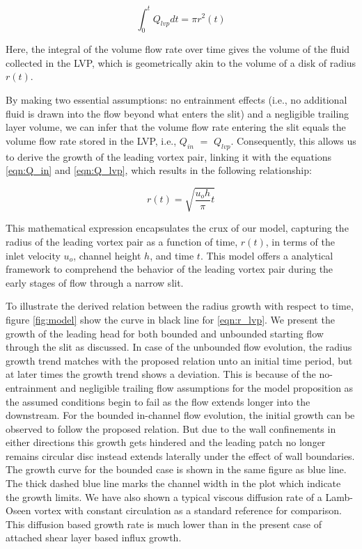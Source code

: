 \documentclass[final,3p,10pt,times,review,authoryear]{elsarticle}
\begin{document}
	\begin{equation}
		\int_{0}^{t}Q_{lvp}dt= \pi r^2(t)
		\label{eqn:Q_lvp}
	\end{equation}
	
	Here, the integral of the volume flow rate over time gives the volume of the fluid collected in the LVP, which is geometrically akin to the volume of a disk of radius $r(t)$.
	
	By making two essential assumptions: no entrainment effects (i.e., no additional fluid is drawn into the flow beyond what enters the slit) and a negligible trailing layer volume, we can infer that the volume flow rate entering the slit equals the volume flow rate stored in the LVP, i.e., $Q_{in}$ $=$ $Q_{lvp}$. Consequently, this allows us to derive the growth of the leading vortex pair, linking it with the equations \ref{eqn:Q_in} and \ref{eqn:Q_lvp}, which results in the following relationship:
	
	\begin{equation}
		r(t) = \sqrt{\frac{u_o h}{\pi}t}
		\label{eqn:r_lvp}
	\end{equation}
	
	This mathematical expression encapsulates the crux of our model, capturing the radius of the leading vortex pair as a function of time, $r(t)$, in terms of the inlet velocity $u_o$, channel height $h$, and time $t$. This model offers a analytical framework to comprehend the behavior of the leading vortex pair during the early stages of flow through a narrow slit. 
	
	To illustrate the derived relation between the radius growth with respect to time, figure \ref{fig:model} show the curve in black line for \ref{eqn:r_lvp}. We present the growth of the leading head for both bounded and unbounded starting flow through the slit as discussed. In case of the unbounded flow evolution, the radius growth trend matches with the proposed relation unto an initial time period, but at later times the growth trend shows a deviation. This is because of the no-entrainment and negligible trailing flow assumptions for the model proposition as the assumed conditions begin to fail as the flow extends longer into the downstream. For the bounded in-channel flow evolution, the initial growth can be observed to follow the proposed relation. But due to the wall confinements in either directions this growth gets hindered and the leading patch no longer remains circular disc instead extends laterally under the effect of wall boundaries. The growth curve for the bounded case is shown in the same figure as blue line. The thick dashed blue line marks the channel width in the plot which indicate the growth limits. We have also shown a typical viscous diffusion rate of a Lamb-Oseen vortex with constant circulation  as a standard reference for comparison. This diffusion based growth rate is much lower than in the present case of attached shear layer based influx growth.
	
\end{document}
